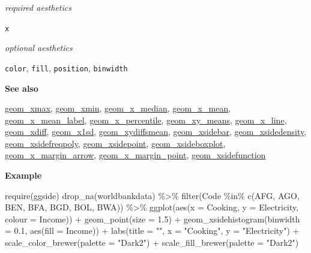 \documentclass[
  letterpaper,
  DIV=11,
  numbers=noendperiod]{scrreprt}
\newenvironment{Shaded}{\begin{snugshade}}{\end{snugshade}}
\newcommand{\AttributeTok}[1]{\textcolor[rgb]{0.40,0.45,0.13}{#1}}
\newcommand{\FloatTok}[1]{\textcolor[rgb]{0.68,0.00,0.00}{#1}}
\newcommand{\FunctionTok}[1]{\textcolor[rgb]{0.28,0.35,0.67}{#1}}
\newcommand{\NormalTok}[1]{\textcolor[rgb]{0.00,0.23,0.31}{#1}}
\newcommand{\SpecialCharTok}[1]{\textcolor[rgb]{0.37,0.37,0.37}{#1}}
\newcommand{\StringTok}[1]{\textcolor[rgb]{0.13,0.47,0.30}{#1}}
\begin{document}
\emph{required aesthetics}

\texttt{x}

\emph{optional aesthetics}

\texttt{color}, \texttt{fill}, \texttt{position}, \texttt{binwidth}

\textbf{See also}

\href{@xmax}{geom\_xmax}, \href{@xmin}{geom\_xmin},
\href{@x_median}{geom\_x\_median}, \href{@x_mean}{geom\_x\_mean},
\href{@x_mean_label}{geom\_x\_mean\_label},
\href{@x_percentile}{geom\_x\_percentile},
\href{@xy_means}{geom\_xy\_means}, \href{@x_line}{geom\_x\_line},
\href{@xdiff}{geom\_xdiff}, \href{@x1sd}{geom\_x1sd},
\href{@xydiffsmean}{geom\_xydiffsmean},
\href{@xsidebar}{geom\_xsidebar},
\href{@xsidedensity}{geom\_xsidedensity},
\href{@xsidefreqpoly}{geom\_xsidefreqpoly},
\href{@xsidepoint}{geom\_xsidepoint},
\href{@xsideboxplot}{geom\_xsideboxplot},
\href{@x_margin_arrow}{geom\_x\_margin\_arrow},
\href{@x_margin_point}{geom\_x\_margin\_point},
\href{@xsidefunction}{geom\_xsidefunction}

\textbf{Example}

\begin{Shaded}
\begin{Highlighting}[]
\FunctionTok{require}\NormalTok{(ggside)}
\FunctionTok{drop\_na}\NormalTok{(worldbankdata) }\SpecialCharTok{\%\textgreater{}\%} 
  \FunctionTok{filter}\NormalTok{(Code }\SpecialCharTok{\%in\%} \FunctionTok{c}\NormalTok{(}\StringTok{\textquotesingle{}AFG\textquotesingle{}}\NormalTok{, }\StringTok{\textquotesingle{}AGO\textquotesingle{}}\NormalTok{, }\StringTok{\textquotesingle{}BEN\textquotesingle{}}\NormalTok{, }\StringTok{\textquotesingle{}BFA\textquotesingle{}}\NormalTok{, }\StringTok{\textquotesingle{}BGD\textquotesingle{}}\NormalTok{, }\StringTok{\textquotesingle{}BOL\textquotesingle{}}\NormalTok{, }\StringTok{\textquotesingle{}BWA\textquotesingle{}}\NormalTok{)) }\SpecialCharTok{\%\textgreater{}\%} 
  \FunctionTok{ggplot}\NormalTok{(}\FunctionTok{aes}\NormalTok{(}\AttributeTok{x =}\NormalTok{ Cooking, }\AttributeTok{y =}\NormalTok{ Electricity, }\AttributeTok{colour =}\NormalTok{ Income)) }\SpecialCharTok{+}
  \FunctionTok{geom\_point}\NormalTok{(}\AttributeTok{size =} \FloatTok{1.5}\NormalTok{) }\SpecialCharTok{+} 
  \FunctionTok{geom\_xsidehistogram}\NormalTok{(}\AttributeTok{binwidth =} \FloatTok{0.1}\NormalTok{, }\FunctionTok{aes}\NormalTok{(}\AttributeTok{fill =}\NormalTok{ Income)) }\SpecialCharTok{+}
  \FunctionTok{labs}\NormalTok{(}\AttributeTok{title =} \StringTok{""}\NormalTok{, }\AttributeTok{x =} \StringTok{"Cooking"}\NormalTok{, }\AttributeTok{y =} \StringTok{"Electricity"}\NormalTok{) }\SpecialCharTok{+} \FunctionTok{scale\_color\_brewer}\NormalTok{(}\AttributeTok{palette =} \StringTok{"Dark2"}\NormalTok{) }\SpecialCharTok{+} \FunctionTok{scale\_fill\_brewer}\NormalTok{(}\AttributeTok{palette =} \StringTok{"Dark2"}\NormalTok{)}
\end{Highlighting}
\end{Shaded}
\end{document}
